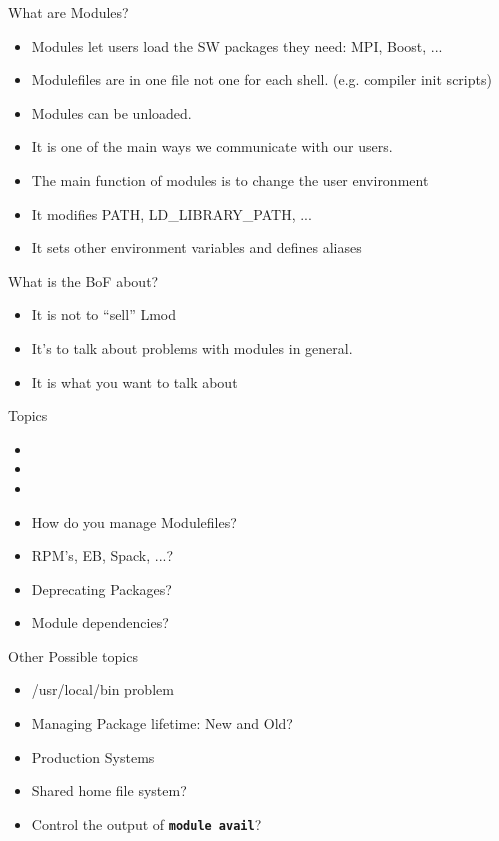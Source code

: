\documentclass{beamer}
\begin{document}
\begin{frame}{What are Modules?}
  \begin{itemize}
    \item Modules let users load the SW packages they need: MPI, Boost, ...
    \item Modulefiles are in one file not one for each
      shell. (e.g. compiler init scripts)
    \item Modules can be unloaded.
    \item It is one of the main ways we communicate with our users.
    \item The main function of modules is to change the user environment
    \item It modifies PATH, LD\_LIBRARY\_PATH, ...
    \item It sets other environment variables and defines aliases
  \end{itemize}
\end{frame}

\begin{frame}{What is the BoF about?}
  \begin{itemize}
    \item It is not to ``sell'' Lmod
    \item It's to talk about problems with modules in general.
    \item It is what you want to talk about
  \end{itemize}
\end{frame}


\begin{frame}{Topics}
  \begin{itemize}
    \item 
    \item 
    \item 
    \item How do you manage Modulefiles?
    \item RPM's, EB, Spack, ...?
    \item Deprecating Packages?
    \item Module dependencies?
  \end{itemize}
\end{frame}

\begin{frame}{Other Possible topics}
  \begin{itemize}
    \item /usr/local/bin problem
    \item Managing Package lifetime: New and Old?
    \item Production Systems
    \item Shared home file system?
    \item Control the output of \texttt{\bf module avail}?
  \end{itemize}
\end{frame}
\end{document}
